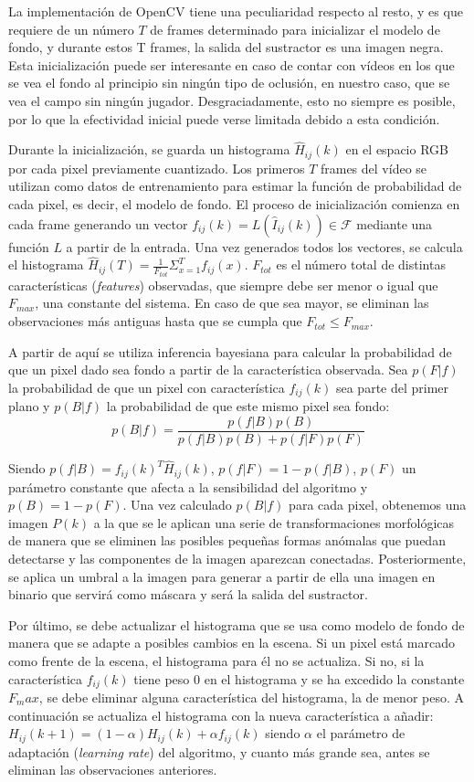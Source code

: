 La implementación de OpenCV tiene una peculiaridad respecto al resto, y es que requiere de un número $T$ de frames determinado para inicializar el modelo de fondo, y durante estos T frames, la salida del sustractor es una imagen negra. Esta inicialización puede ser interesante en caso de contar con vídeos en los que se vea el fondo al principio sin ningún tipo de oclusión, en nuestro caso, que se vea el campo sin ningún jugador. Desgraciadamente, esto no siempre es posible, por lo que la efectividad inicial puede verse limitada debido a esta condición.

Durante la inicialización, se guarda un histograma $\hat{H}_{ij}(k)$ en el espacio RGB por cada pixel previamente cuantizado. Los primeros $T$ frames del vídeo se utilizan como datos de entrenamiento para estimar la función de probabilidad de cada pixel, es decir, el modelo de fondo. El proceso de inicialización comienza en cada frame generando un vector $f_{ij}(k) = L(\hat{I}_{ij}(k)) \in \mathcal{F}$ mediante una función $L$ a partir de la entrada. Una vez generados todos los vectores, se calcula el histograma $\hat{H}_{ij}(T) = \frac{1}{F_{tot}}\Sigma_{x = 1}^T f_{ij}(x)$. $F_{tot}$ es el número total de distintas características (\textit{features}) observadas, que siempre debe ser menor o igual que $F_{max}$, una constante del sistema. En caso de que sea mayor, se eliminan las observaciones más antiguas hasta que se cumpla que $F_{tot} \leq F_{max}$.

A partir de aquí se utiliza inferencia bayesiana para calcular la probabilidad de que un pixel dado sea fondo a partir de la característica observada. Sea $p(F|f)$ la probabilidad de que un pixel con característica $f_{ij}(k)$ sea parte del primer plano y $p(B|f)$ la probabilidad de que este mismo pixel sea fondo:
\[
    p(B|f) = \frac{p(f|B)p(B)}{p(f|B)p(B)+p(f|F)p(F)}
\]

Siendo $p(f|B) = f_{ij}(k)^T\hat{H}_{ij}(k)$, $p(f|F) = 1 - p(f|B)$, $p(F)$ un parámetro constante que afecta a la sensibilidad del algoritmo y $p(B) = 1 - p(F)$. Una vez calculado $p(B|f)$ para cada pixel, obtenemos una imagen $P(k)$ a la que se le aplican una serie de transformaciones morfológicas de manera que se eliminen las posibles pequeñas formas anómalas que puedan detectarse y las componentes de la imagen aparezcan conectadas. Posteriormente, se aplica un umbral a la imagen para generar a partir de ella una imagen en binario que servirá como máscara y será la salida del sustractor.

Por último, se debe actualizar el histograma que se usa como modelo de fondo de manera que se adapte a posibles cambios en la escena. Si un pixel está marcado como frente de la escena, el histograma para él no se actualiza. Si no, si la característica $f_{ij}(k)$ tiene peso 0 en el histograma y se ha excedido la constante $F_max$, se debe eliminar alguna característica del histograma, la de menor peso. A continuación se actualiza el histograma con la nueva característica a añadir: $H_{ij}(k+1)=(1-\alpha)H_{ij}(k)+\alpha f_{ij}(k)$ siendo $\alpha$ el parámetro de adaptación (\textit{learning rate}) del algoritmo, y cuanto más grande sea, antes se eliminan las observaciones anteriores.

